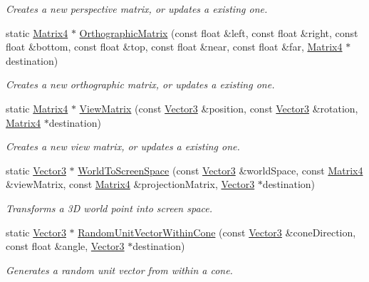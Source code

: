 \begin{DoxyCompactItemize}
\begin{DoxyCompactList}\small\item\em Creates a new perspective matrix, or updates a existing one. \end{DoxyCompactList}\item 
static \hyperlink{class_flounder_1_1_matrix4}{Matrix4} $\ast$ \hyperlink{class_flounder_1_1_matrix4_ae164bc0e40f09945ebc2a24b01bb91ec}{Orthographic\+Matrix} (const float \&left, const float \&right, const float \&bottom, const float \&top, const float \&near, const float \&far, \hyperlink{class_flounder_1_1_matrix4}{Matrix4} $\ast$destination)
\begin{DoxyCompactList}\small\item\em Creates a new orthographic matrix, or updates a existing one. \end{DoxyCompactList}\item 
static \hyperlink{class_flounder_1_1_matrix4}{Matrix4} $\ast$ \hyperlink{class_flounder_1_1_matrix4_a511e0cbc3959644d149dec2c2fe14ece}{View\+Matrix} (const \hyperlink{class_flounder_1_1_vector3}{Vector3} \&position, const \hyperlink{class_flounder_1_1_vector3}{Vector3} \&rotation, \hyperlink{class_flounder_1_1_matrix4}{Matrix4} $\ast$destination)
\begin{DoxyCompactList}\small\item\em Creates a new view matrix, or updates a existing one. \end{DoxyCompactList}\item 
static \hyperlink{class_flounder_1_1_vector3}{Vector3} $\ast$ \hyperlink{class_flounder_1_1_matrix4_af8f9dcdd5e99ba3dc19d94ba4759c028}{World\+To\+Screen\+Space} (const \hyperlink{class_flounder_1_1_vector3}{Vector3} \&world\+Space, const \hyperlink{class_flounder_1_1_matrix4}{Matrix4} \&view\+Matrix, const \hyperlink{class_flounder_1_1_matrix4}{Matrix4} \&projection\+Matrix, \hyperlink{class_flounder_1_1_vector3}{Vector3} $\ast$destination)
\begin{DoxyCompactList}\small\item\em Transforms a 3D world point into screen space. \end{DoxyCompactList}\item 
static \hyperlink{class_flounder_1_1_vector3}{Vector3} $\ast$ \hyperlink{class_flounder_1_1_matrix4_adc83e303e05630ce0ef8b128726dd5b6}{Random\+Unit\+Vector\+Within\+Cone} (const \hyperlink{class_flounder_1_1_vector3}{Vector3} \&cone\+Direction, const float \&angle, \hyperlink{class_flounder_1_1_vector3}{Vector3} $\ast$destination)
\begin{DoxyCompactList}\small\item\em Generates a random unit vector from within a cone. \end{DoxyCompactList}\end{DoxyCompactItemize}
